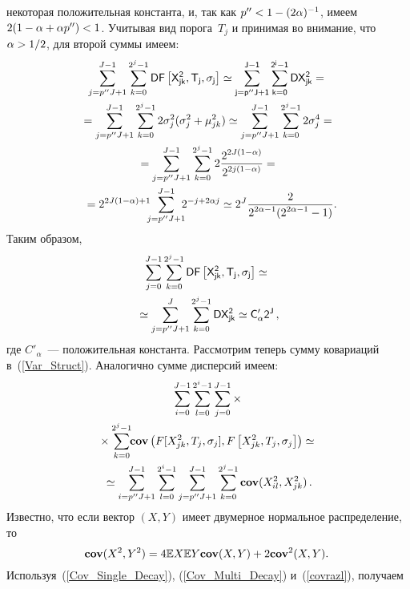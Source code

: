 \begin{multicols}{2}
некоторая положительная константа, и, так как $p''\hm<1\hm-(2\alpha)^{-1}$, 
имеем $2(1\hm-\alpha\hm+\alpha p'')\hm<1$. Учитывая вид порога~$T_j$ 
и принимая во внимание, что $\alpha\hm>1/2$, для второй суммы имеем:
\begin{multline*}
\sum\limits_{j=p''J+1}^{J-1}\sum\limits_{k=0}^{2^j-1} \Variance 
F\left[X_{jk}^2,T_j,\sigma_j\right]\simeq
\sum\limits_{j=p''J+1}^{J-1}\sum\limits_{k=0}^{2^j-1}\Variance X_{jk}^2={} \\
{}=\sum\limits_{j=p''J+1}^{J-1}\sum\limits_{k=0}^{2^j-1} 
2\sigma_j^2(\sigma_j^2 +\mu_{jk}^2)\simeq \sum\limits_{j=p''J+1}^{J-1}
\sum\limits_{k=0}^{2^j-1} 2\sigma_j^4
= {}\\
{}= \sum\limits_{j=p''J+1}^{J-1}\sum\limits_{k=0}^{2^j-1} 
2\fr{2^{2J(1-\alpha)}}{2^{2j(1-\alpha)}} = {}\\
{}= 2^{2J(1-\alpha)+1}\!\!\! \sum\limits_{j=p''J+1}^{J-1}\!\!\! 2^{-j+2\alpha j} 
\simeq 2^{J}\fr{2}{2^{2\alpha-1}(2^{2\alpha-1}-1)}.\hspace*{-4.40202pt}
\end{multline*}
Таким образом,
\begin{multline}
\sum\limits_{j=0}^{J-1}\sum\limits_{k=0}^{2^j-1} 
\sf D F\left[X_{jk}^2,T_j,\sigma_j\right]\simeq{}\\
{}\simeq
\sum\limits_{j=p''J+1}^{J}\sum\limits_{k=0}^{2^j-1}\sf D X_{jk}^2\simeq C'_\alpha2^{J}\,,
\label{Var_Order}
\end{multline}
где $C'_\alpha$~--- положительная константа.
Рассмотрим теперь сумму ковариаций в~(\ref{Var_Struct}). Аналогично сумме дисперсий имеем:
\begin{multline*}
\sum\limits_{i=0}^{J-1} \sum\limits_{l=0}^{2^i-1}\sum\limits_{j=0}^{J-1}\times{}\\
{}\times
\sum\limits_{k=0}^{2^j-1} \!\!\textbf{cov}\left(F[X_{jk}^2,T_j,\sigma_j],
F\left[X_{jk}^2,T_j,\sigma_j\right]\right)\simeq{}\\
{}\simeq
\sum\limits_{i=p''J+1}^{J-1} \sum\limits_{l=0}^{2^i-1}\sum\limits_{j=p''J+1}^{J-1}
\sum\limits_{k=0}^{2^j-1} \textbf{cov}(X_{il}^2,X_{jk}^2)\,.
\end{multline*}
Известно, что если вектор $(X,Y)$ имеет двумерное нормальное распределение, то
\begin{equation}
\hspace*{-2mm}\cov(X^2,Y^2) = 4\Expect X \Expect Y\cov(X,Y) + 2\cov^2(X,Y).\!\!
\label{covrazl}
\end{equation}
Используя~(\ref{Cov_Single_Decay}), (\ref{Cov_Multi_Decay}) и~(\ref{covrazl}), получаем

\end{multicols}
